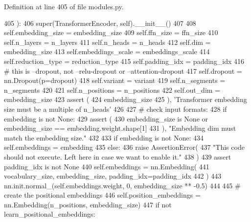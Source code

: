 Definition at line 405 of file modules.\+py.


\begin{DoxyCode}
405     ):
406         super(TransformerEncoder, self).\_\_init\_\_()
407 
408         self.embedding\_size = embedding\_size
409         self.ffn\_size = ffn\_size
410         self.n\_layers = n\_layers
411         self.n\_heads = n\_heads
412         self.dim = embedding\_size
413         self.embeddings\_scale = embeddings\_scale
414         self.reduction\_type = reduction\_type
415         self.padding\_idx = padding\_idx
416         \textcolor{comment}{# this is --dropout, not --relu-dropout or --attention-dropout}
417         self.dropout = nn.Dropout(p=dropout)
418         self.variant = variant
419         self.n\_segments = n\_segments
420 
421         self.n\_positions = n\_positions
422         self.out\_dim = embedding\_size
423         \textcolor{keyword}{assert} (
424             embedding\_size %
425         ), \textcolor{stringliteral}{'Transformer embedding size must be a multiple of n\_heads'}
426 
427         \textcolor{comment}{# check input formats:}
428         \textcolor{keywordflow}{if} embedding \textcolor{keywordflow}{is} \textcolor{keywordflow}{not} \textcolor{keywordtype}{None}:
429             \textcolor{keyword}{assert} (
430                 embedding\_size \textcolor{keywordflow}{is} \textcolor{keywordtype}{None} \textcolor{keywordflow}{or} embedding\_size == embedding.weight.shape[1]
431             ), \textcolor{stringliteral}{"Embedding dim must match the embedding size."}
432 
433         \textcolor{keywordflow}{if} embedding \textcolor{keywordflow}{is} \textcolor{keywordflow}{not} \textcolor{keywordtype}{None}:
434             self.embeddings = embedding
435         \textcolor{keywordflow}{else}:
436             \textcolor{keywordflow}{raise} AssertionError(
437                 \textcolor{stringliteral}{"This code should not execute. Left here in case we want to enable it."}
438             )
439             \textcolor{keyword}{assert} padding\_idx \textcolor{keywordflow}{is} \textcolor{keywordflow}{not} \textcolor{keywordtype}{None}
440             self.embeddings = nn.Embedding(
441                 vocabulary\_size, embedding\_size, padding\_idx=padding\_idx
442             )
443             nn.init.normal\_(self.embeddings.weight, 0, embedding\_size ** -0.5)
444 
445         \textcolor{comment}{# create the positional embeddings}
446         self.position\_embeddings = nn.Embedding(n\_positions, embedding\_size)
447         \textcolor{keywordflow}{if} \textcolor{keywordflow}{not} learn\_positional\_embeddings:

\end{DoxyCode}
